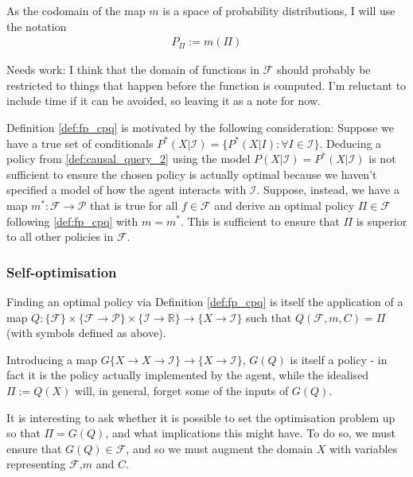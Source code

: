 As the codomain of the map $m$ is a space of probability distributions, I will use the notation
\begin{align}
    P_\Pi := m(\Pi)
\end{align}

Needs work: I think that the domain of functions in $\mathcal{F}$ should probably be restricted to things that happen before the function is computed. I'm reluctant to include time if it can be avoided, so leaving it as a note for now.

Definition \ref{def:fp_cpq} is motivated by the following consideration: Suppose we have a true set of conditionals $P^*(X|\mathcal{I})=\{P^*(X|I):\forall I \in \mathcal{I}\}$. Deducing a policy from \ref{def:causal_query_2} using the model $P(X|\mathcal{I})=P^*(X|\mathcal{I})$ is not sufficient to ensure the chosen policy is actually optimal because we haven't specified a model of how the agent interacts with $\mathcal{I}$. Suppose, instead, we have a map $m^*:\mathcal{F}\to\mathcal{P}$ that is true for all $f\in\mathcal{F}$ and derive an optimal policy $\Pi\in\mathcal{F}$ following \ref{def:fp_cpq} with $m=m^*$. This is sufficient to ensure that $\Pi$ is superior to all other policies in $\mathcal{F}$.



\subsubsection{Self-optimisation}\label{sssec:self_reflection}

Finding an optimal policy via Definition \ref{def:fp_cpq} is itself the application of a map $Q:\{\mathcal{F}\}\times\{\mathcal{F}\to\mathcal{P}\}\times\{\mathcal{I}\to\mathbb{R}\}\to\{X\to\mathcal{I}\}$ such that $Q(\mathcal{F},m,C)=\Pi$ (with symbols defined as above). 

Introducing a map $G\{X\to X\to \mathcal{I}\} \to \{X\to\mathcal{I}\}$, $G(Q)$ is itself a policy - in fact it is the policy actually implemented by the agent, while the idealised $\Pi:=Q(X)$ will, in general, forget some of the inputs of $G(Q)$. 

It is interesting to ask whether it is possible to set the optimisation problem up so that $\Pi=G(Q)$, and what implications this might have. To do so, we must ensure that $G(Q)\in\mathcal{F}$, and so we must augment the domain $X$ with variables representing $\mathcal{F}$,$m$ and $C$.

